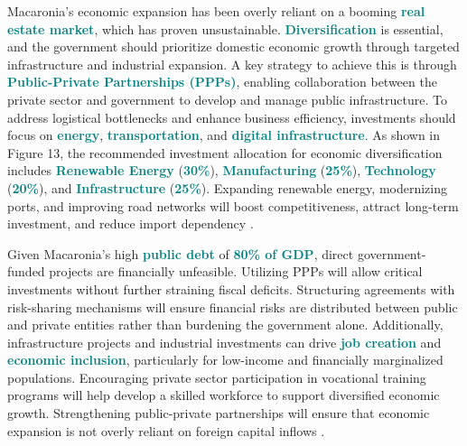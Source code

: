 Macaronia's economic expansion has been overly reliant on a booming
\textcolor{teal}{\textbf{real estate market}}, which has proven unsustainable.
\textcolor{teal}{\textbf{Diversification}} is essential, and the government should
prioritize domestic economic growth through targeted infrastructure and industrial 
expansion. A key strategy to achieve this is through
\textcolor{teal}{\textbf{Public-Private Partnerships (PPPs)}}, enabling 
collaboration between the private sector and government to develop and manage public
infrastructure. To address logistical bottlenecks and enhance business efficiency, investments
should focus on \textcolor{teal}{\textbf{energy}}, \textcolor{teal}{\textbf{transportation}},
and \textcolor{teal}{\textbf{digital infrastructure}}. As shown in Figure 13, the recommended
investment allocation for economic diversification includes 
\textcolor{teal}{\textbf{Renewable Energy}} (\textcolor{teal}{\textbf{30\%}}),
\textcolor{teal}{\textbf{Manufacturing}} (\textcolor{teal}{\textbf{25\%}}), 
\textcolor{teal}{\textbf{Technology}} (\textcolor{teal}{\textbf{20\%}}), and 
\textcolor{teal}{\textbf{Infrastructure}} (\textcolor{teal}{\textbf{25\%}}). 
Expanding renewable energy, modernizing ports, and improving road networks will boost
competitiveness, attract long-term investment, and reduce import dependency \textcolor{orange}{\cite{engel2014}}.

Given Macaronia's high \textcolor{teal}{\textbf{public debt}} of \textcolor{teal}{\textbf{80\% of GDP}},
direct government-funded projects are financially unfeasible. Utilizing PPPs will allow critical investments
without further straining fiscal deficits. Structuring agreements with risk-sharing mechanisms will ensure 
financial risks are distributed between public and private entities rather than burdening the government alone.
Additionally, infrastructure projects and industrial investments can drive 
\textcolor{teal}{\textbf{job creation}} and \textcolor{teal}{\textbf{economic inclusion}}, 
particularly for low-income and financially marginalized populations. Encouraging private sector
participation in vocational training programs will help develop a skilled workforce to support
diversified economic growth. Strengthening public-private partnerships will ensure that economic
expansion is not overly reliant on foreign capital inflows \textcolor{orange}{\cite{bernanke2013}}.
